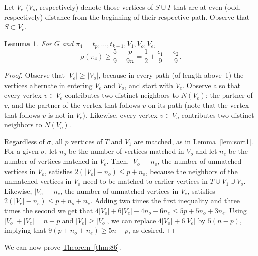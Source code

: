\documentclass[11pt]{article}
\numberwithin{equation}{section}
\newtheorem{lemma}[theorem]{Lemma}
\theoremstyle{definition}
\theoremstyle{plain}
\newcommand{\expref}[2]{\hyperref[#2]{#1~\ref{#2}}}
\theoremstyle{plain}
\begin{document}
Let $V_e$ ($V_o$, respectively) denote those vertices of $S \cup I$ that are at even (odd, respectively) distance from the beginning of their respective path. Observe that $S \subset V_e$.

\begin{lemma}
	\label{lem:sort2}
	For $G$ and $\pi_4 = t_p, \ldots, t_{k+1}, V_1, V_o, V_e$,
	$$\rho(\pi_4) \ge \frac{5}{9} - \frac{p}{9n} = \frac{1}{2} + \frac{\epsilon_1}{9} - \frac{\epsilon_2}{9}.$$
\end{lemma}

\begin{proof}
	Observe that $|V_e| \ge |V_o|$, because in every path (of length above~1) the vertices alternate in entering $V_e$ and $V_o$, and start with $V_e$. Observe also that every vertex $v \in V_e$ contributes two distinct neighbors to $N(V_e)$: the partner of $v$, and the partner of the vertex that follows $v$ on its path (note that the vertex that follows $v$ is not in $V_e$). Likewise, every vertex $v \in V_o$ contributes two distinct neighbors to $N(V_o)$.
	
	
	
	
	
	Regardless of $\sigma$, all $p$ vertices of $T$ and $V_1$ are matched, as in \expref{Lemma}{lem:sort1}. For a given $\sigma$, let $n_o$ be the number of vertices matched in $V_o$ and let  $n_e$ be the number of vertices matched in $V_e$.
	Then, $|V_o| - n_o$, the number of unmatched vertices  in $V_o$, satisfies $2(|V_o| - n_o) \le p + n_o$, because the neighbors of the unmatched vertices in $V_o$ need to be matched to earlier vertices in $T \cup V_1 \cup V_o$.
	Likewise,  $|V_e| - n_e$, the number of unmatched vertices  in $V_e$, satisfies $2(|V_e| - n_e) \le p + n_o + n_e$.
	Adding two times the first inequality and three times the second we get that $4|V_o| + 6|V_e| - 4n_o - 6n_e \le 5p + 5n_o + 3n_e$. Using $|V_o| + |V_e| = n-p$ and $|V_e| \ge |V_o|$, we can replace $4|V_o| + 6|V_e|$ by $5(n-p)$, implying that $9(p + n_o + n_e) \ge 5n - p$, as desired.
\end{proof}

%

We can now prove \expref{Theorem}{thm:86}.
\end{document}
